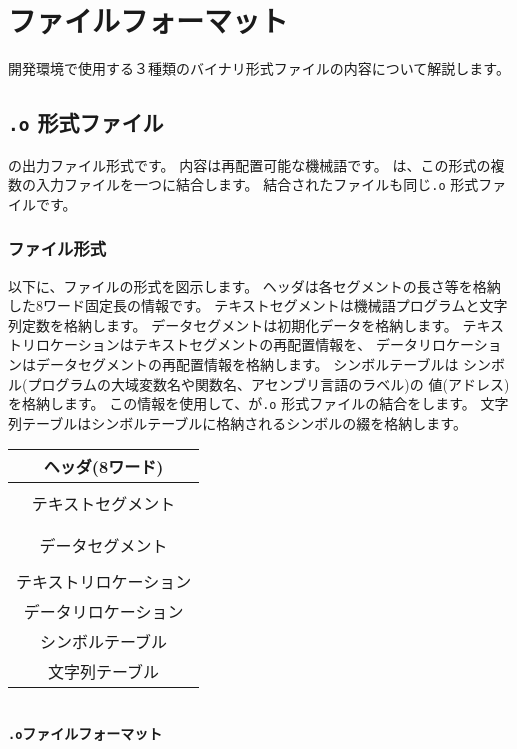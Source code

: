 % 
%
\chapter{ファイルフォーマット}

\tac 開発環境で使用する３種類のバイナリ形式ファイルの内容について解説します。

\section{{\tt .o} 形式ファイル}
\label{app:oformat}

{\as}の出力ファイル形式です。
内容は再配置可能な機械語です。
{\ld}は、この形式の複数の入力ファイルを一つに結合します。
結合されたファイルも同じ{\tt .o} 形式ファイルです。

\subsection{ファイル形式}

以下に、ファイルの形式を図示します。
ヘッダは各セグメントの長さ等を格納した8ワード固定長の情報です。
テキストセグメントは機械語プログラムと文字列定数を格納します。
データセグメントは初期化データを格納します。
テキストリロケーションはテキストセグメントの再配置情報を、
データリロケーションはデータセグメントの再配置情報を格納します。
シンボルテーブルは
シンボル(\cmm プログラムの大域変数名や関数名、アセンブリ言語のラベル)の
値(アドレス)を格納します。
この情報を使用して、{\ld}が{\tt .o} 形式ファイルの結合をします。
文字列テーブルはシンボルテーブルに格納されるシンボルの綴を格納します。

\begin{myminipage}
\begin{tabular}{|c|}
\hline
ヘッダ(8ワード) \\
\hline
\\
テキストセグメント \\
\\
\hline
\\
データセグメント \\
\\
\hline
テキストリロケーション \\
\hline
データリロケーション \\
\hline
シンボルテーブル \\
\hline
文字列テーブル \\
\hline
\end{tabular}
\\\vspace{0.2cm}
{\bf {\tt .o}ファイルフォーマット}
\end{myminipage}

